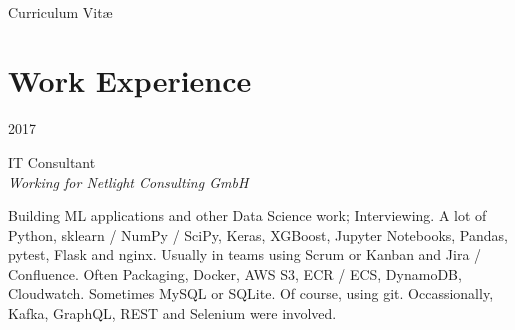 \documentclass[a4paper,10pt]{article} %
\begin{document}
\color{text1} %


\par{\\ %
{\Huge \color{headings} Curriculum {Vit\ae}\\[15pt]\par}


\begin{minipage}[t]{0.5\textwidth}
\vspace{0pt} %


\section{Work Experience}


{\raggedleft\textsc{2017}\par}

{\raggedright\large IT Consultant\\
\textit{Working for Netlight Consulting GmbH}\\[5pt]}

\normalsize{Building ML applications and other Data Science work; Interviewing.
A lot of Python, sklearn / NumPy / SciPy, Keras, XGBoost, Jupyter Notebooks,
Pandas, pytest, Flask and nginx. Usually in teams using Scrum or Kanban and
Jira / Confluence. Often Packaging, Docker, AWS S3, ECR / ECS, DynamoDB,
Cloudwatch. Sometimes MySQL or SQLite. Of course, using git. Occassionally,
Kafka, GraphQL, REST and Selenium were involved.}\\



\end{minipage}}
\end{document}
